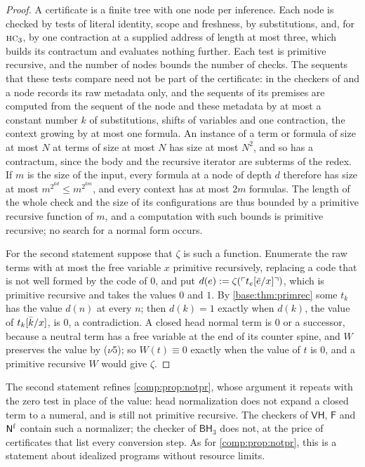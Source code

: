 \begin{proof}
A certificate is a finite tree with one node per inference. Each node is
checked by tests of literal identity, scope and freshness, by substitutions,
and, for $\rulename{HC}_3$, by one contraction at a supplied address of
length at most three, which builds its contractum and evaluates nothing
further. Each test is primitive recursive, and the number of nodes bounds
the number of checks. The sequents that these tests compare need not be part
of the certificate: in the checkers of  and
 a node records its raw metadata only, and the
sequents of its premises are computed from the sequent of the node and these
metadata by at most a constant number $k$ of substitutions, shifts of
variables and one contraction, the context growing by at most one formula.
An instance of a term or formula of size at most $N$ at terms of size at
most $N$ has size at most $N^{2}$, and so has a contractum, since the body
and the recursive iterator are subterms of the redex. If $m$ is the size of
the input, every formula at a node of depth $d$ therefore has size at most
$m^{2^{kd}}\le m^{2^{km}}$, and every context has at most $2m$ formulas.
The length of the whole check and the size of its configurations are thus
bounded by a primitive recursive function of $m$, and a computation with
such bounds is primitive recursive; no search for a normal form occurs.

For the second statement suppose that $\zeta$ is such a function. Enumerate the
raw terms with at most the free variable $x$ primitive recursively,
replacing a code that is not well formed by the code of $0$, and put
$d(e)\mathrel{:=}\zeta(\ulcorner t_e[\bar e/x]\urcorner)$, which is
primitive recursive and takes the values $0$ and $1$. By
\cref{base:thm:primrec} some $t_k$ has the value $d(n)$ at every $n$; then
$d(k)=1$ exactly when $d(k)$, the value of $t_k[\bar k/x]$, is $0$,
a contradiction. A closed head normal term is $0$ or a successor, because a
neutral term has a free variable at the end of its counter spine, and $W$
preserves the value by ($\nu$5); so $W(t)\equiv0$ exactly when the value of
$t$ is $0$, and a primitive recursive $W$ would give $\zeta$.
\end{proof}

The second statement refines \cref{comp:prop:notpr}, whose argument it
repeats with the zero test in place of the value: head normalization does
not expand a closed term to a numeral, and is still not primitive recursive.
The checkers of $\mathsf{VH}$, $\mathsf{F}$ and $\mathsf{N}^{\mathrm f}$ contain
such a normalizer; the checker of $\mathsf{BH}_3$ does not, at the price of
certificates that list every conversion step. As for \cref{comp:prop:notpr},
this is a statement about idealized programs without resource limits.

